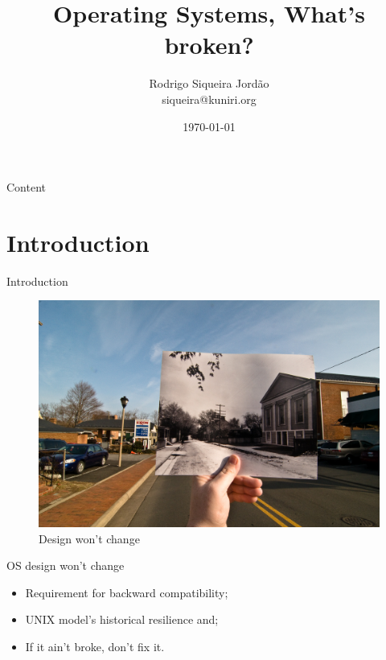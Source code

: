 \documentclass[10pt]{beamer}
\title[] %
{ %
      \textbf{Operating Systems, What's broken?}
}
\subtitle[Operating Systems, What's broken?]
{
}
\author[Rodrigo Siqueira Jordão]
{      Rodrigo Siqueira Jordão\\
      {\ttfamily siqueira@kuniri.org}
}
\institute[]
{
      Institute of Mathematics and Statistics\\
      University of Sao Paulo\\
  
}
\date{\today}
\begin{document}

{\1%
\begin{frame} 
  \titlepage %
\end{frame}}

\begin{frame}{Content}{}
  \tableofcontents
\end{frame}

\section{Introduction}
\begin{frame}{Introduction}
  \begin{figure}[ht]
    \vspace{5pt}
    \centering
    \includegraphics[width=1\textwidth, keepaspectratio=true]{images/designwontchange.jpg}
    \caption {Design won't change}
    \label {assembler}
  \end{figure}
\end{frame}

\begin{frame}{OS design won't change}
  \begin{itemize}
    \item Requirement for backward compatibility; \pause
    \item UNIX model's historical resilience and; \pause
    \item If it ain't broke, don't fix it.
  \end{itemize}
\end{frame}
\end{document}
